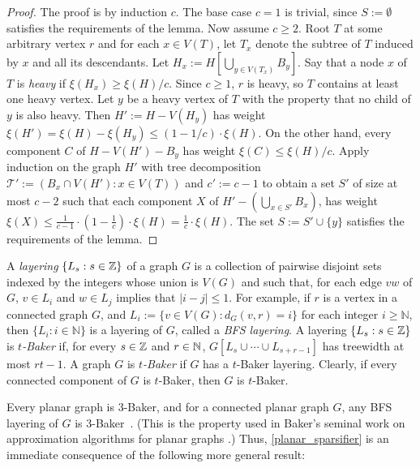 \documentclass{patmorin}
\renewcommand{\ge}{\geqslant}
\renewcommand{\le}{\leqslant}
\renewcommand{\geq}{\geqslant}
\newcommand{\defin}[1]{\emph{\textcolor{brightmaroon}{#1}}}
\newcommand{\NN}{\mathbb{N}}
\begin{document}
\begin{proof}
  The proof is by induction $c$.  The base case $c=1$ is trivial, since $S:=\emptyset$ satisfies the requirements of the lemma.  Now assume $c\ge 2$.  Root $T$ at some arbitrary vertex $r$ and for each $x\in V(T)$, let $T_x$ denote the subtree of $T$ induced by $x$ and all its descendants.  Let $H_x:=H[\bigcup_{y\in V(T_x)} B_y]$.  Say that a node $x$ of $T$ is \defin{heavy} if $\xi(H_x) \ge \xi(H)/c$. Since $c\ge 1$, $r$ is heavy, so $T$ contains at least one heavy vertex. Let $y$ be a heavy vertex of $T$ with the property that no child of $y$ is also heavy.  Then $H':=H-V(H_y)$ has weight $\xi(H') = \xi(H)-\xi(H_y) \le (1-1/c)\cdot\xi(H)$.  On the other hand, every component $C$ of $H-V(H')-B_y$ has weight $\xi(C) \le \xi(H)/c$.  Apply induction on the graph $H'$ with tree decomposition $\mathcal{T}':=(B_x\cap V(H'):x\in V(T))$ and $c':=c-1$ to obtain a set $S'$ of size at most $c-2$ such that each component $X$ of $H'-(\bigcup_{x\in S'} B_x)$, has weight $\xi(X) \le \tfrac{1}{c-1}\cdot(1-\tfrac{1}{c})\cdot\xi(H) = \tfrac{1}{c}\cdot \xi(H)$.  The set $S:=S'\cup\{y\}$ satisfies the requirements of the lemma.
\end{proof}


A \defin{layering} $\{L_s:s\in\mathbb{Z}\}$ of a graph $G$ is a collection of pairwise disjoint sets indexed by the integers whose union is $V(G)$ and such that, for each edge $vw$ of $G$, $v\in L_i$ and $w\in L_j$ implies that $|i-j|\le 1$.
For example, if $r$ is a vertex in a connected graph $G$, and $L_i:=\{v\in V(G):d_G(v,r)=i\}$ for each integer $i\geq \NN$, then $\{L_i:i\in\NN\}$ is a layering of $G$, called a \defin{BFS layering}. A layering $\{L_s:s\in\mathbb{Z}\}$ is \defin{$t$-Baker} if, for every $s\in\mathbb{Z}$ and $r\in\mathbb{N}$, $G[L_s\cup\cdots\cup L_{s+r-1}]$ has treewidth at most $rt-1$. A graph $G$ is \defin{$t$-Baker} if $G$ has a $t$-Baker layering.  Clearly, if every connected component of $G$ is $t$-Baker, then $G$ is $t$-Baker.

Every planar graph is $3$-Baker, and for a connected planar graph $G$, any BFS layering of $G$ is $3$-Baker~\cite{RS-III}. (This is the property used in Baker's seminal work on approximation algorithms for planar graphs \cite{baker:approximation}.) Thus, \cref{planar_sparsifier} is an immediate consequence of the following more general result:
\end{document}
